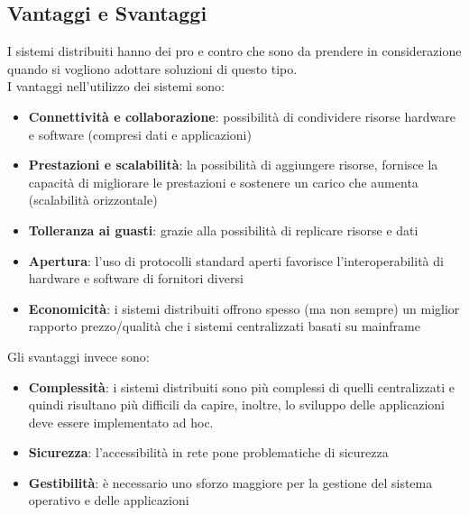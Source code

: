 \subsection{Vantaggi e Svantaggi}
\label{subsec:vantaggi e svantaggi}
I sistemi distribuiti hanno dei pro e contro che sono da prendere in considerazione quando si vogliono adottare soluzioni di questo tipo.  
\\I vantaggi nell'utilizzo dei sistemi sono:
\begin{itemize}
\item \textbf{Connettività e collaborazione}: possibilità di condividere risorse hardware e software (compresi dati e applicazioni)
\item \textbf{Prestazioni e scalabilità}: la possibilità di aggiungere risorse, fornisce la capacità di migliorare le prestazioni e sostenere un carico che aumenta (scalabilità orizzontale)
\item \textbf{Tolleranza ai guasti}: grazie alla possibilità di replicare risorse e dati
\item \textbf{Apertura}: l'uso di protocolli standard aperti favorisce l'interoperabilità di hardware e software di fornitori diversi
\item \textbf{Economicità}: i sistemi distribuiti offrono spesso (ma non sempre) un miglior rapporto prezzo/qualità che i sistemi centralizzati basati su mainframe
\end{itemize}

Gli svantaggi invece sono:
\begin{itemize}
\item \textbf{Complessità}: i sistemi distribuiti sono più complessi di quelli centralizzati e quindi risultano più difficili da capire, inoltre, lo sviluppo delle applicazioni deve essere implementato ad hoc.
\item \textbf{Sicurezza}: l’accessibilità in rete pone problematiche di sicurezza
\item \textbf{Gestibilità}: è necessario uno sforzo maggiore per la gestione del sistema operativo e delle applicazioni
\end{itemize}
